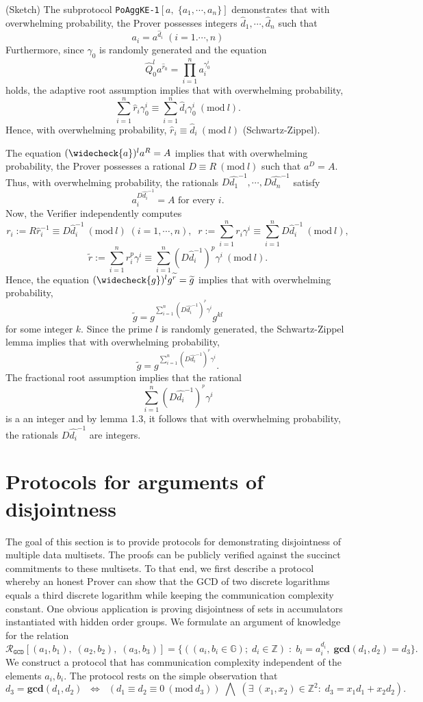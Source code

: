 \documentclass[11pt, lettersize, notitlepage, leqno, footskip=0.6cm]{article}
\newcommand{\bz}{\mathbb Z}
\newcommand{\pl}{\prod\limits}
\newcommand{\slim}{\sum\limits}
\newcommand{\ttt}{\texttt}
\newcommand{\LRA}{\Longleftrightarrow}
\newcommand{\wti}{\widetilde}
\newcommand{\mc}{\mathcal}
\newcommand{\mb}{\mathbb}
\newcommand{\mbf}{\mathbf}
\newcommand{\what}{\widehat}
\newcommand{\weck}{\widecheck}
\newcommand{\vs}{\vspace{-0.15cm}}
\newcommand{\op}{overwhelming probability}
\newcommand{\Mod}[1]{\ (\mathrm{mod}\ #1)}
\newcommand{\GCD}{\mbf{gcd}}
\numberwithin{equation}{section}
\begin{document}
\begin{prf} (Sketch) The subprotocol \verb|PoAggKE-1|$[a,\;\{a_1,\cdots,a_n\}]$ demonstrates that with \op, the Prover possesses integers $\what{d}_1,\cdots,\what{d}_n$ such that \vs $$a_i = a^{\what{d}_i}\; (i=1.\cdots,n)$$ Furthermore, since $\gamma_0$ is randomly generated and the equation \vs $$\what{Q}_0^la^{\what{r}_0} = \pl_{i=1}^{n} a_i^{\gamma_0^i} $$ holds, the adaptive root assumption implies that with \op, \vs $$\slim_{i=1}^n\what{r}_i\gamma_0^i\equiv \slim_{i=1}^n \what{d}_i\gamma_0^i\Mod{l}.$$ Hence, with \op, $\what{r}_i\equiv \what{d}_i\Mod{l}$ (Schwartz-Zippel).

The equation $(\weck{a})^la^R= A $ implies that with \op, the Prover possesses a rational $D\equiv R\Mod{l}$ such that $a^D = A$. Thus, with \op, the rationals $D\what{d_1}^{-1},\cdots,D\what{d_n}^{-1}$ satisfy \vs $$a_i^{D\what{d_i}^{-1}} = A \text{ for every }i.$$ Now, the Verifier independently computes \vs $$r_i:= R\what{r}_{i}^{-1}\equiv D\what{d}_i^{-1}\Mod{l}\;(i=1,\cdots,n),\;\;r:= \slim_{i=1}^n r_i\gamma^i\equiv \slim_{i=1}^n D\what{d}_i^{-1}\Mod{l},$$\vspace{-0.3cm} $$\wti{r}:= {\slim_{i=1}^n r_i^{p}\gamma^i}\equiv {\slim_{i=1}^n (D\what{d}_i^{-1})^{p}\gamma^i}\Mod{l}.$$ Hence, the equation $(\weck{g})^lg^{\wti{r}} = \wti{g}$ implies that with \op, \vs $$\wti{g} = g^{\slim_{i=1}^n (D\what{d_i}^{-1})^{^{p}}\gamma^i}g^{kl} $$ for some integer $k$. Since the prime $l$ is randomly generated, the Schwartz-Zippel lemma implies that with \op, \vs $$\wti{g} = g^{\slim_{i=1}^n (D\what{d_i}^{-1})^{^{p}}\gamma^i}. $$ The fractional root assumption implies that the rational \vs $$\slim_{i=1}^n (D\what{d_i}^{-1})^{^{p}}\gamma^i$$ is a an integer and by lemma 1.3, it follows that with \op, the rationals $D\what{d_i}^{-1}$ are integers.\end{prf}




\section{\fontsize{12}{12}\selectfont Protocols for arguments of disjointness}

The goal of this section is to provide protocols for demonstrating disjointness of multiple data multisets. The proofs can be publicly verified against the succinct commitments to these multisets. To that end, we first describe a protocol whereby an honest Prover can show that the GCD of two discrete logarithms equals a third discrete logarithm while keeping the communication complexity constant. One obvious application is proving disjointness of sets in accumulators instantiated with hidden order groups. We formulate an argument of knowledge for the relation \vs  $$\mc{R}_{{\ttt{GCD}}}[(a_1,b_1),\;(a_2,b_2),\;(a_3,b_3)] = \{((a_i, b_i\in\mb{G});\;d_i\in\bz)\;:\; b_i = a_i^{d_i},\;\GCD(d_1,d_2)=d_3  \} .$$ We construct a protocol that has communication complexity independent of the elements $a_i, b_i$. The protocol rests on the simple observation that \vs $$d_3 = \GCD(d_1, d_2)\;\; \LRA \;\;(d_1\equiv d_2\equiv 0 \Mod{d_3})\;\bigwedge \; \left(\exists \; (x_1,x_2)\in \bz^2:\; d_3 = x_1d_1+x_2d_2  \right).$$
 
\end{document}
